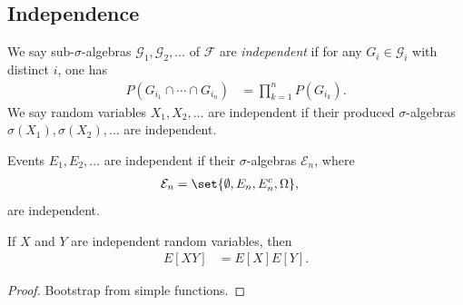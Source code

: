 \documentclass[10pt]{mypackage}
\begin{document}
\subsection{Independence}%
\begin{definition}
  We say sub-$\sigma$-algebras $\mathcal{G}_1,\mathcal{G}_2,\dots$ of $\mathcal{F}$ are \textit{independent} if for any $G_i\in \mathcal{G}_i$ with distinct $i$, one has
  \begin{align*}
    P\left( G_{i_1}\cap\cdots\cap G_{i_n} \right) &= \prod_{k=1}^{n} P\left( G_{i_k} \right).
  \end{align*}
  We say random variables $X_1,X_2,\dots$ are independent if their produced $\sigma$-algebras $\sigma\left( X_1 \right),\sigma\left( X_2 \right),\dots$ are independent.

  Events $E_1,E_2,\dots$ are independent if their $\sigma$-algebras $\mathcal{E}_n$, where
  \begin{align*}
    \mathcal{E}_n &= \set{\emptyset,E_n,E_n^{c},\Omega},
  \end{align*}
  are independent. 
\end{definition}
\begin{theorem}
  If $X$ and $Y$ are independent random variables, then
  \begin{align*}
    E\left[ XY \right] &= E\left[ X \right]E\left[ Y \right].
  \end{align*}
\end{theorem}
\begin{proof}
  Bootstrap from simple functions.
\end{proof}
\end{document}
